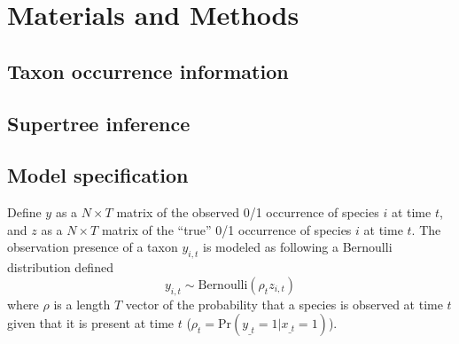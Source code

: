 \documentclass[12pt,letterpaper]{article}
\begin{document}
\section*{Materials and Methods}

\subsection*{Taxon occurrence information}



\subsection*{Supertree inference}



\subsection*{Model specification}


Define \(y\) as a \(N \times T\) matrix of the observed 0/1 occurrence of species \(i\) at time \(t\), and \(z\) as a \(N \times T\) matrix of the ``true'' 0/1 occurrence of species \(i\) at time \(t\). The observation presence of a taxon \(y_{i,t}\) is modeled as following a Bernoulli distribution defined
\begin{equation}
  y_{i,t} \sim \text{Bernoulli}(\rho_{t} z_{i,t})
  \label{eq:latent}
\end{equation}
where \(\rho\) is a length \(T\) vector of the probability that a species is observed at time \(t\) given that it is present at time \(t\) (\(\rho_{t} = \text{Pr}(y_{\_t} = 1 | x_{\_t} = 1)\)).
\end{document}
